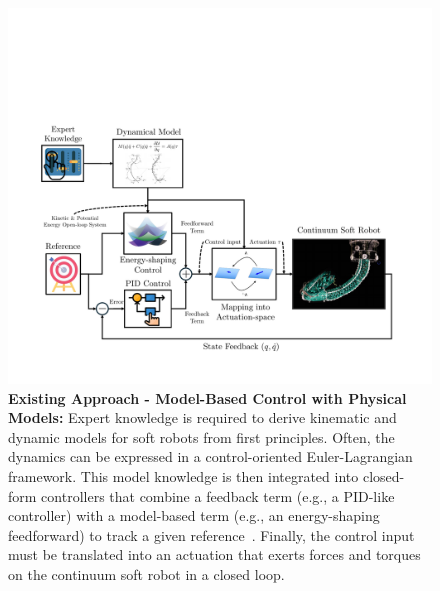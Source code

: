 \begin{figure}[ht]
    \centering
    \includegraphics[width=1.0\linewidth]{introduction/figures/model_based_control_with_physical_models_v1_cropped.pdf}
    \caption{\textbf{Existing Approach - Model-Based Control with Physical Models:}
    Expert knowledge is required to derive kinematic and dynamic models for soft robots from first principles. Often, the dynamics can be expressed in a control-oriented Euler-Lagrangian framework. This model knowledge is then integrated into closed-form controllers that combine a feedback term (e.g., a PID-like controller) with a model-based term (e.g., an energy-shaping feedforward) to track a given reference~\citep{della2023model}. Finally, the control input must be translated into an actuation that exerts forces and torques on the continuum soft robot in a closed loop.
    }
    \label{fig:introduction:model_based_control_with_physical_models}
\end{figure}

